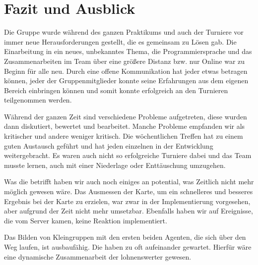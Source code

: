 \section{Fazit und Ausblick}

Die Gruppe wurde während des ganzen Praktikums und auch der Turniere vor immer neue Herausforderungen gestellt, die es gemeinsam zu Lösen gab. Die Einarbeitung in ein neues, unbekanntes Thema, die Programmiersprache und das Zusammenarbeiten im Team über eine größere Distanz bzw. nur Online war zu Beginn für alle neu. Durch eine offene Kommunikation hat jeder etwas betragen können, jeder der Gruppenmitglieder konnte seine Erfahrungen aus dem eigenen Bereich einbringen können und somit konnte erfolgreich an den Turnieren teilgenommen werden.

Während der ganzen Zeit sind verschiedene Probleme aufgetreten, diese wurden dann diskutiert, bewertet und bearbeitet. Manche Probleme empfanden wir als kritischer und andere weniger kritisch. Die wöchentlichen Treffen hat zu einem guten Austausch geführt und hat jeden einzelnen in der Entwicklung weitergebracht. Es waren auch nicht so erfolgreiche Turniere dabei und das Team musste lernen, auch mit einer Niederlage oder Enttäuschung umzugehen.

Was die \Agents betrifft haben wir auch noch einiges an potential, was Zeitlich nicht mehr möglich gewesen wäre. Das Ausmessen der Karte, um ein schnelleres und besseres Ergebnis bei der Karte zu erzielen, war zwar in der Implementierung vorgesehen, aber aufgrund der Zeit nicht mehr umsetzbar. Ebenfalls haben wir auf Ereignisse, die vom Server kamen, keine Reaktion implementiert. 

Das Bilden von Kleingruppen mit den ersten beiden Agenten, die sich über den Weg laufen, ist ausbaufähig. Die \Agents haben zu oft aufeinander gewartet. Hierfür wäre eine dynamische Zusammenarbeit der \Agents lohnenswerter gewesen. 

